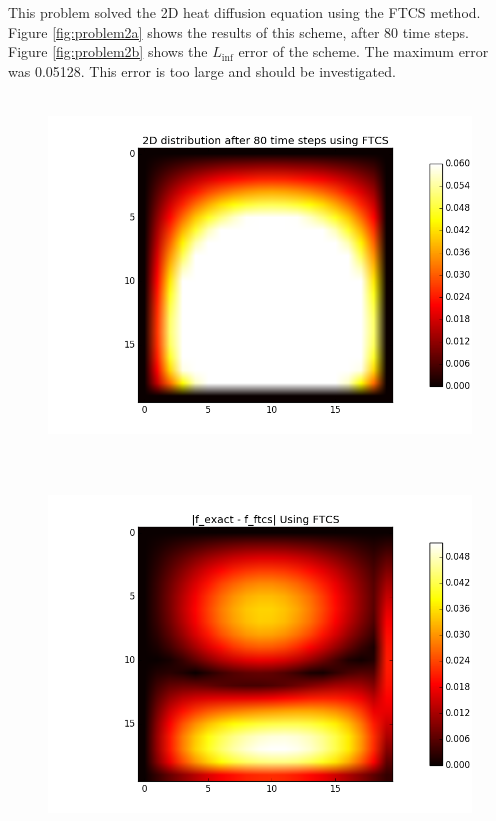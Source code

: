 \documentclass[12pt]{article}
\begin{document}
\noindent This problem solved the 2D heat diffusion equation using the FTCS method. Figure \ref{fig:problem2a} shows the results of this scheme, after 80 time steps. Figure \ref{fig:problem2b} shows the $L_{\inf}$ error of the scheme. The maximum error was 0.05128. This error is too large and should be investigated.

\begin{figure}[H]
	\centering
	\includegraphics[height=3.75in]{problem2_plot.png}
	\label{fig:problem2_plot}
\end{figure}



\begin{figure}[H]
	\centering
	\includegraphics[height=3.75in]{problem2_error.png}
	\label{fig:problem2_error}
\end{figure}
\end{document}
